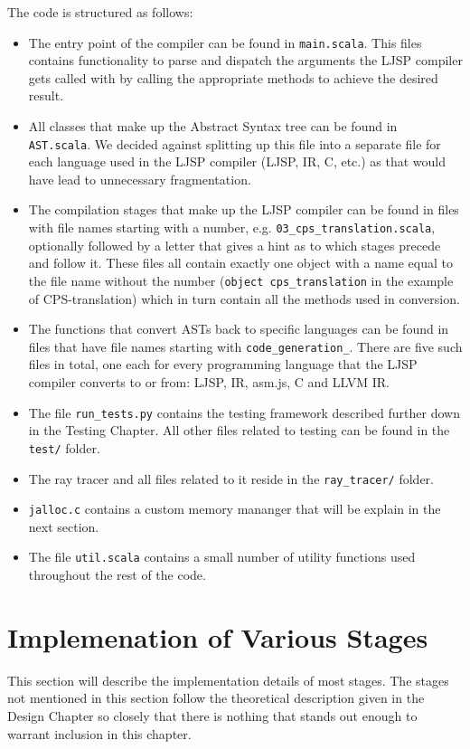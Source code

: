 \documentclass[11pt]{report}
\begin{document}
The code is structured as follows:
\begin{itemize}
\item The entry point of the compiler can be found in \texttt{main.scala}. This files contains functionality to parse and dispatch the arguments the LJSP compiler gets called with by calling the appropriate methods to achieve the desired result.
\item All classes that make up the Abstract Syntax tree can be found in \texttt{AST.scala}. We decided against splitting up this file into a separate file for each language used in the LJSP compiler (LJSP, IR, C, etc.) as that would have lead to unnecessary fragmentation.
\item The compilation stages that make up the LJSP compiler can be found in files with file names starting with a number, e.g. \texttt{03_cps_translation.scala}, optionally followed by a letter that gives a hint as to which stages precede and follow it. These files all contain exactly one object with a name equal to the file name without the number (\texttt{object cps_translation} in the example of CPS-translation) which in turn contain all the methods used in conversion. 
\item The functions that convert ASTs back to specific languages can be found in files that have file names starting with \texttt{code_generation_}. There are five such files in total, one each for every programming language that the LJSP compiler converts to or from: LJSP, IR, asm.js, C and LLVM IR.
\item The file \texttt{run_tests.py} contains the testing framework described further down in the Testing Chapter. All other files related to testing can be found in the \texttt{test/} folder.
\item The ray tracer and all files related to it reside in the \texttt{ray_tracer/} folder.
\item \texttt{jalloc.c} contains a custom memory mananger that will be explain in the next section.
\item The file \texttt{util.scala} contains a small number of utility functions used throughout the rest of the code.
\end{itemize}

\section{Implemenation of Various Stages}
This section will describe the implementation details of most stages. The stages not mentioned in this section follow the theoretical description given in the Design Chapter so closely that there is nothing that stands out enough to warrant inclusion in this chapter.
\end{document}
